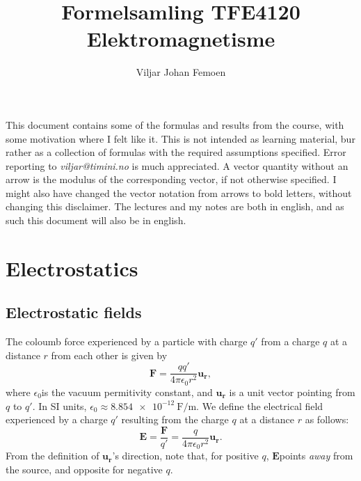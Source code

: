 \documentclass[a4paper, 12pt]{article}
\title{Formelsamling TFE4120 Elektromagnetisme}
\renewcommand{\vec}[1]{\mathbf{#1}}
\newcommand{\E}{\ensuremath{\vec{E}}}
\newcommand{\e}{\ensuremath{\epsilon_0}}
\begin{document}
\author{Viljar Johan Femoen} %

\flushbottom
\maketitle
\thispagestyle{empty}
\vskip 20pt
\vskip 2pt
\noindent This document contains some of the formulas and results from the course, with some motivation where I felt like it. This is not intended as learning material, bur rather as a collection of formulas with the required assumptions specified. Error reporting to \textit{viljar@timini.no} is much appreciated. A vector quantity without an arrow is the modulus of the corresponding vector, if not otherwise specified. I might also have changed the vector notation from arrows to bold letters, without changing this disclaimer. The lectures and my notes are both in english, and as such this document will also be in english.

\tableofcontents

\section{Electrostatics}
\subsection{Electrostatic fields}
    The coloumb force experienced by a particle with charge $q'$ from a charge $q$ at a distance $r$ from each other is given by 
    \begin{equation}
        \vec{F} = \frac{qq'}{4\pi\e r^2}\vec{u_r},
    \end{equation}
    where \e is the vacuum permitivity constant, and $\vec{u_r}$ is a unit vector pointing from $q$ to $q'$. In SI units, $\e \approx \SI{8.854e-12}{\farad \per \metre}$.
    We define the electrical field experienced by a charge $q'$ resulting from the charge $q$ at a distance $r$ as follows:
    \begin{equation}
        \E = \frac{\vec{F}}{q'} = \frac{q}{4\pi\e r^2}\vec{u_r}.
    \end{equation}
    From the definition of $\vec{u_r}$'s direction, note that, for positive $q$, \E points \textit{away} from the source, and opposite for negative $q$.
    
\end{document}
